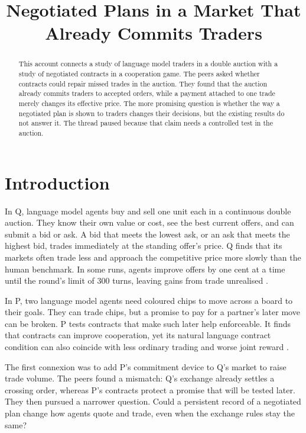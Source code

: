 \documentclass{article}
\title{Negotiated Plans in a Market That Already Commits Traders}
\begin{document}
\maketitle

\begin{abstract}
This account connects a study of language model traders in a double auction with a study of
negotiated contracts in a cooperation game. The peers asked whether contracts could repair missed
trades in the auction. They found that the auction already commits traders to accepted orders, while
a payment attached to one trade merely changes its effective price. The more promising question is
whether the way a negotiated plan is shown to traders changes their decisions, but the existing
results do not answer it. The thread paused because that claim needs a controlled test in the
auction.
\end{abstract}

\section{Introduction}

In Q, language model agents buy and sell one unit each in a continuous double auction. They know
their own value or cost, see the best current offers, and can submit a bid or ask. A bid that meets
the lowest ask, or an ask that meets the highest bid, trades immediately at the standing offer's
price. Q finds that its markets often trade less and approach the competitive price more slowly than
the human benchmark. In some runs, agents improve offers by one cent at a time until the round's
limit of 300 turns, leaving gains from trade unrealised \cite{Q}.

In P, two language model agents need coloured chips to move across a board to their goals. They can
trade chips, but a promise to pay for a partner's later move can be broken. P tests contracts that
make such later help enforceable. It finds that contracts can improve cooperation, yet its natural
language contract condition can also coincide with less ordinary trading and worse joint reward
\cite{P}.

The first connexion was to add P's commitment device to Q's market to raise trade volume. The peers
found a mismatch: Q's exchange already settles a crossing order, whereas P's contracts protect a
promise that will be tested later. They then pursued a narrower question. Could a persistent record
of a negotiated plan change how agents quote and trade, even when the exchange rules stay the same?
\end{document}

